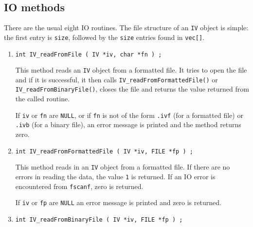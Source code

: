 \subsection{IO methods}
\label{subsection:IV:proto:IO}
\par
There are the usual eight IO routines.
The file structure of an {\tt IV} object is simple:
the first entry is {\tt size}, followed by the {\tt size} entries
found in {\tt vec[]}.
\par
\begin{enumerate}
\item
\begin{verbatim}
int IV_readFromFile ( IV *iv, char *fn ) ;
\end{verbatim}
\par
This method reads an {\tt IV} object from a formatted file.
It tries to open the file and if it is successful, 
it then calls {\tt IV\_readFromFormattedFile()} or
{\tt IV\_readFromBinaryFile()}, 
closes the file
and returns the value returned from the called routine.
\par {}
If {\tt iv} or {\tt fn} are {\tt NULL}, 
or if {\tt fn} is not of the form
{\tt *.ivf} (for a formatted file) 
or {\tt *.ivb} (for a binary file),
an error message is printed and the method returns zero.
\item
\begin{verbatim}
int IV_readFromFormattedFile ( IV *iv, FILE *fp ) ;
\end{verbatim}
\par
This method reads in an {\tt IV} object from a formatted file.
If there are no errors in reading the data, 
the value {\tt 1} is returned.
If an IO error is encountered from {\tt fscanf}, zero is returned.
\par {}
If {\tt iv} or {\tt fp} are {\tt NULL} 
an error message is printed and zero is returned.
\item
\begin{verbatim}
int IV_readFromBinaryFile ( IV *iv, FILE *fp ) ;
\end{verbatim}

\end{enumerate}
